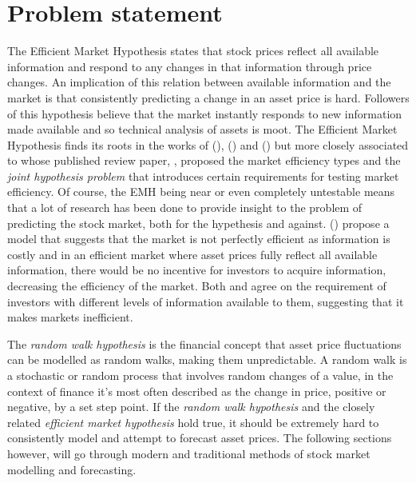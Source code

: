 \section{Problem statement}
The Efficient Market Hypothesis states that stock prices reflect all available information and respond to any changes in that information through price changes. An implication of this relation between available information and the market is that consistently predicting a change in an asset price is hard. Followers of this hypothesis believe that the market instantly responds to new information made available and so technical analysis of assets is moot. The Efficient Market Hypothesis finds its roots in the works of \citeauthor{bachelier} (\citeyear{bachelier}), \citeauthor{mandelbrot} (\citeyear{mandelbrot}) and \citeauthor{samuelson} (\citeyear{samuelson}) but more closely associated to \citeauthor{fama_efficient_market} whose published review paper, \emph{}, proposed the market efficiency types and the \emph{joint hypothesis problem} that introduces certain requirements for testing market efficiency. Of course, the EMH being near or even completely untestable means that a lot of research has been done to provide insight to the problem of predicting the stock market, both for the hypethesis and against. \citeauthor{grossman-stiglitz} (\citeyear{grossman-stiglitz}) propose a model that suggests that the market is not perfectly efficient as information is costly and in an efficient market where asset prices fully reflect all available information, there would be no incentive for investors to acquire information, decreasing the efficiency of the market. Both \citeauthor{grossman-stiglitz} and \citeauthor{blackEMH} agree on the requirement of investors with different levels of information available to them, suggesting that it makes markets inefficient.

The \emph{random walk hypothesis} is the financial concept that asset price fluctuations can be modelled as random walks, making them unpredictable. A random walk is a stochastic or random process that involves random changes of a value, in the context of finance it's most often described as the change in price, positive or negative, by a set step point. If the \emph{random walk hypothesis} and the closely related \emph{efficient market hypothesis} hold true, it should be extremely hard to consistently model and attempt to forecast asset prices. The following sections however, will go through modern and traditional methods of stock market modelling and forecasting.

